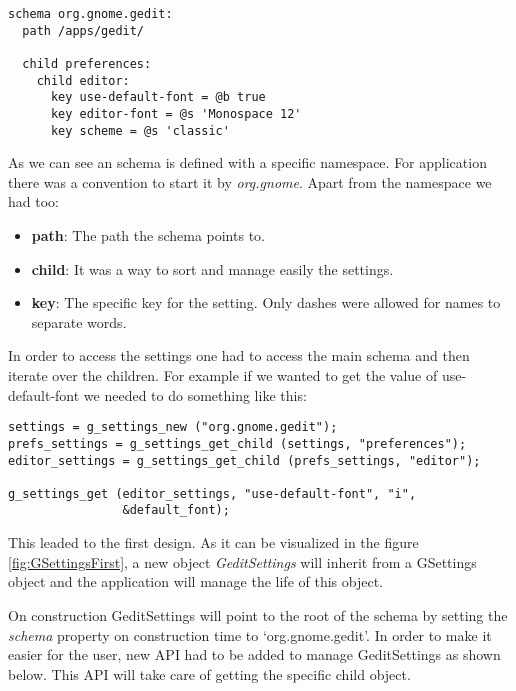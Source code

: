 \begin{lstlisting}[style=GObject]
schema org.gnome.gedit:
  path /apps/gedit/

  child preferences:
    child editor:
      key use-default-font = @b true
      key editor-font = @s 'Monospace 12'
      key scheme = @s 'classic'

\end{lstlisting}

As we can see an schema is defined with a specific namespace. For \GNOME application there was a convention to start it by \emph{org.gnome}. Apart from the namespace we had too:
\begin{itemize}
  \item \textbf{path}: The path the schema points to.
  \item \textbf{child}: It was a way to sort and manage easily the settings.
  \item \textbf{key}: The specific key for the setting. Only dashes were allowed for names to separate words.
\end{itemize}

In order to access the settings one had to access the main schema and then iterate over the children. For example if we wanted to get the value of use-default-font we needed to do something like this:

\begin{lstlisting}[style=GObject]
settings = g_settings_new ("org.gnome.gedit");
prefs_settings = g_settings_get_child (settings, "preferences");
editor_settings = g_settings_get_child (prefs_settings, "editor");

g_settings_get (editor_settings, "use-default-font", "i",
                &default_font);
\end{lstlisting}

This leaded to the first design. As it can be visualized in the figure \ref{fig:GSettingsFirst}, a new object \emph{GeditSettings} will inherit from a GSettings object and the application will manage the life of this object.


On construction GeditSettings will point to the root of the schema by setting the \emph{schema} property on construction time to `org.gnome.gedit'.
In order to make it easier for the user, new API had to be added to manage GeditSettings as shown below. This API will take care of getting the specific child object.

